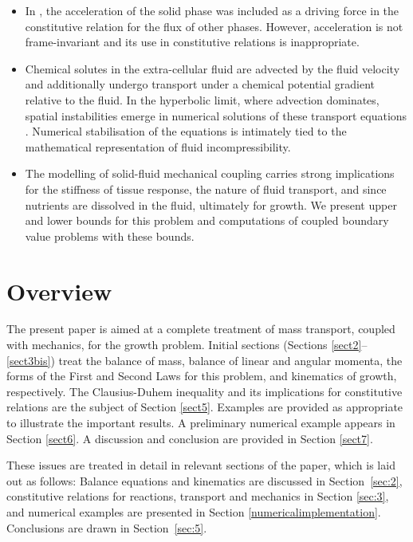 \begin{itemize}
\item[\textbullet] In \citet{growthpaper}, the acceleration of the
  solid phase was included as a driving force in the constitutive
  relation for the flux of other phases. However, acceleration is not
  frame-invariant and its use in constitutive relations is
  inappropriate.

\item[\textbullet] Chemical solutes in the extra-cellular fluid are
  advected by the fluid velocity and additionally undergo transport
  under a chemical potential gradient relative to the fluid. In the
  hyperbolic limit, where advection dominates, spatial instabilities
  emerge in numerical solutions of these transport equations
  \citep{Brooks:82, Paper6}. Numerical stabilisation of the equations
  is intimately tied to the mathematical representation of fluid
  incompressibility.

\item[\textbullet] The modelling of solid-fluid mechanical coupling
  carries strong implications for the stiffness of tissue response,
  the nature of fluid transport, and since nutrients are dissolved in
  the fluid, ultimately for growth. We present upper and lower bounds
  for this problem and computations of coupled boundary value problems with
  these bounds.
\end{itemize}

\section{Overview}
\label{overview}

The present paper is aimed at a complete treatment of mass
transport, coupled with mechanics, for the growth problem. Initial
sections (Sections \ref{sect2}--\ref{sect3bis}) treat the balance
of mass, balance of linear and angular momenta, the forms of the
First and Second Laws for this problem, and kinematics of growth,
respectively. The Clausius-Duhem inequality and its implications
for constitutive relations are the subject of Section \ref{sect5}.
Examples are provided as appropriate to illustrate the important
results. A preliminary numerical example appears in Section
\ref{sect6}. A discussion and conclusion are provided in Section
\ref{sect7}.

These issues are treated in detail in relevant sections of the paper,
which is laid out as follows: Balance equations and kinematics are
discussed in Section~\ref{sec:2}, constitutive relations for
reactions, transport and mechanics in Section \ref{sec:3}, and
numerical examples are presented in Section
\ref{numericalimplementation}. Conclusions are drawn in
Section~\ref{sec:5}.

%

